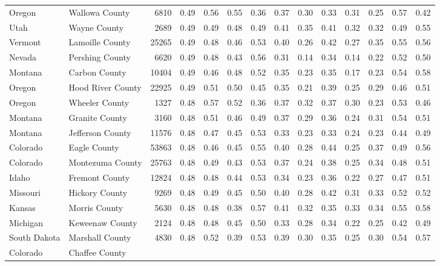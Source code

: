 \documentclass[10pt, letterpaper]{article}
\begin{document}
\begin{spacing}{1.4}
\begin{table}
{\begin{tabular}{llrrrrrrrrrrrr}
    \\ Oregon & Wallowa County & 6810 & 0.49 & 0.56 & 0.55 &
    0.36 & 0.37 & 0.30 & 0.33 & 0.31 & 0.25 & 0.57 &
    0.42 \\ Utah & Wayne County & 2689 & 0.49 & 0.49 & 0.48 &
    0.49 & 0.41 & 0.35 & 0.41 & 0.32 & 0.32 & 0.49 &
    0.55 \\ Vermont & Lamoille County & 25265 & 0.49 & 0.48 &
    0.46 & 0.53 & 0.40 & 0.26 & 0.42 & 0.27 & 0.35 &
    0.55 & 0.56 \\ Nevada & Pershing County & 6620 & 0.49 & 0.48
    & 0.43 & 0.56 & 0.31 & 0.14 & 0.34 & 0.14 & 0.22
    & 0.52 & 0.50 \\ Montana & Carbon County & 10404 & 0.49 &
    0.46 & 0.48 & 0.52 & 0.35 & 0.23 & 0.35 & 0.17 &
    0.23 & 0.54 & 0.58 \\ Oregon & Hood River County & 22925 &
    0.49 & 0.51 & 0.50 & 0.45 & 0.35 & 0.21 & 0.39 &
    0.25 & 0.29 & 0.46 & 0.51 \\ Oregon & Wheeler County & 1327
    & 0.48 & 0.57 & 0.52 & 0.36 & 0.37 & 0.32 & 0.37
    & 0.30 & 0.23 & 0.53 & 0.46 \\ Montana & Granite County &
    3160 & 0.48 & 0.51 & 0.46 & 0.49 & 0.37 & 0.29 &
    0.36 & 0.24 & 0.31 & 0.54 & 0.51 \\ Montana & Jefferson
    County & 11576 & 0.48 & 0.47 & 0.45 & 0.53 & 0.33 &
    0.23 & 0.33 & 0.24 & 0.23 & 0.44 & 0.49 \\ Colorado
    & Eagle County & 53863 & 0.48 & 0.46 & 0.45 & 0.55 &
    0.40 & 0.28 & 0.44 & 0.25 & 0.37 & 0.49 & 0.56
    \\ Colorado & Montezuma County & 25763 & 0.48 & 0.49 & 0.43 &
    0.53 & 0.37 & 0.24 & 0.38 & 0.25 & 0.34 & 0.48 &
    0.51 \\ Idaho & Fremont County & 12824 & 0.48 & 0.48 & 0.44
    & 0.53 & 0.34 & 0.23 & 0.36 & 0.22 & 0.27 & 0.47
    & 0.51 \\ Missouri & Hickory County & 9269 & 0.48 & 0.49 &
    0.45 & 0.50 & 0.40 & 0.28 & 0.42 & 0.31 & 0.33 &
    0.52 & 0.52 \\ Kansas & Morris County & 5630 & 0.48 & 0.48 &
    0.38 & 0.57 & 0.41 & 0.32 & 0.35 & 0.33 & 0.34 &
    0.55 & 0.58 \\ Michigan & Keweenaw County & 2124 & 0.48 &
    0.48 & 0.45 & 0.50 & 0.33 & 0.28 & 0.34 & 0.22 &
    0.25 & 0.42 & 0.49 \\ South Dakota & Marshall County & 4830 &
    0.48 & 0.52 & 0.39 & 0.53 & 0.39 & 0.30 & 0.35 &
    0.25 & 0.30 & 0.54 & 0.57 \\ Colorado & Chaffee County &

\end{tabular}}
\end{table}
\end{spacing}
\end{document}
